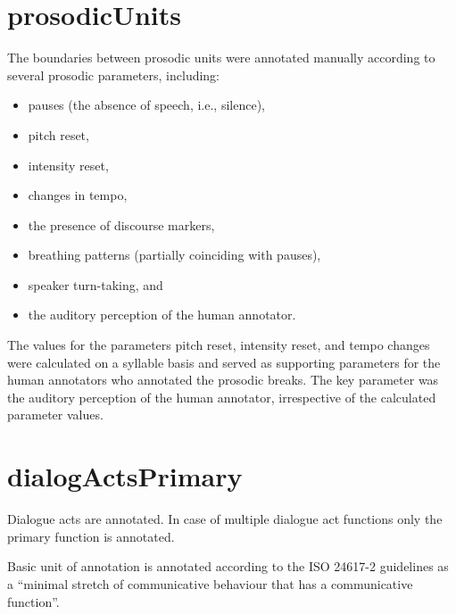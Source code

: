 \documentclass[a4paper,oneside,12pt]{article}
\begin{document}
\section{prosodicUnits}
The boundaries between prosodic units were annotated manually according to
several prosodic parameters, including:
\begin{itemize}

  \item  pauses (the absence of speech, i.e., silence),
  \item  pitch reset,
  \item  intensity reset,
  \item  changes in tempo,
  \item  the presence of discourse markers,
  \item  breathing patterns (partially coinciding with pauses),
  \item  speaker turn-taking, and
  \item  the auditory perception of the human annotator.
\end{itemize}
The values for the parameters pitch reset, intensity reset, and tempo changes
were calculated on a syllable basis and served as supporting parameters for the
human annotators who annotated the prosodic breaks. The key parameter was the
auditory perception of the human annotator, irrespective of the calculated
parameter values.
\section{dialogActsPrimary}
Dialogue acts are annotated. In case of multiple dialogue act functions only the
primary function is annotated.

Basic unit of annotation is annotated according to the ISO 24617-2 guidelines as
a ``minimal stretch of communicative behaviour that has a communicative
function''.
\end{document}
